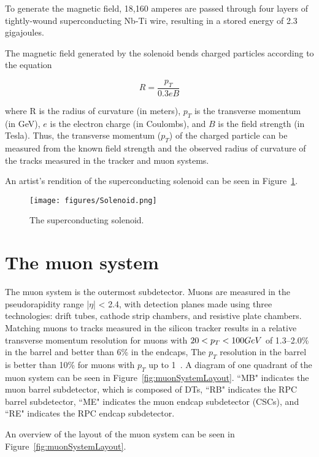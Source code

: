 To generate the magnetic field, 18,160 amperes are passed through four layers of tightly-wound superconducting Nb-Ti wire, resulting in a stored energy of 2.3 gigajoules.

The magnetic field generated by the solenoid bends charged particles according to the equation

\begin{equation}
R = \frac{p_{T}}{0.3eB}
\end{equation}

\noindent where R is the radius of curvature (in meters), $p_{T}$ is the transverse momentum (in GeV), $e$ is the electron charge (in Coulombs), and $B$ is the field strength (in Tesla). Thus, the transverse momentum ($p_{T}$) of the charged particle can be measured from the known field strength and the observed radius of curvature of the tracks measured in the tracker and muon systems.\cite{TDR}

An artist's rendition of the superconducting solenoid can be seen in Figure~\ref{fig:Solenoid}.

\begin{figure}\centering
  \texttt{[image: figures/Solenoid.png]}
  \caption{\label{fig:Solenoid} The superconducting solenoid.}
\end{figure}

\section{The muon system}

The muon system is the outermost subdetector. Muons are measured in the pseudorapidity range |$\eta$| < 2.4, with detection planes made using three technologies: drift tubes, cathode strip chambers, and resistive plate chambers. Matching muons to tracks measured in the silicon tracker results in a relative transverse momentum resolution for muons with $20 < p_T < 100GeV$ of 1.3--2.0\% in the barrel and better than 6\% in the endcaps, The $p_T$ resolution in the barrel is better than 10\% for muons with $p_T$ up to 1\TeV~\cite{Chatrchyan:2012xi}. A diagram of one quadrant of the muon system can be seen in Figure~\ref{fig:muonSystemLayout}. ``MB" indicates the muon barrel subdetector, which is composed of DTs, ``RB" indicates the RPC barrel subdetector, ``ME" indicates the muon endcap subdetector (CSCs), and ``RE" indicates the RPC endcap subdetector. 

An overview of the layout of the muon system can be seen in Figure~\ref{fig:muonSystemLayout}.

